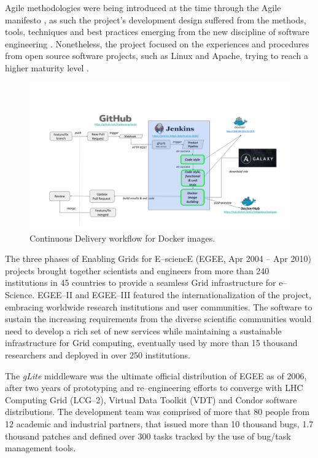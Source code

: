\documentclass[journal]{IEEEtran}
\begin{document}
Agile methodologies were being introduced at the time
through the Agile manifesto \cite{agile-manifesto}, as such the project's
development design suffered from the methods, tools, techniques and best
practices emerging from the new discipline of software engineering
\cite{agile}. Nonetheless, the project focused on the experiences and procedures
from open source software projects, such as Linux and Apache, trying to reach a
higher maturity level \cite{cmm}.

\begin{figure}
\centering
\includegraphics[width=\textwidth]{images/devops.png}
\caption{Continuous Delivery workflow for Docker images.}
\label{fig:fig_CD}
\end{figure}

The three phases of Enabling Grids for E--sciencE (EGEE, Apr 2004 -- Apr 2010)
\cite{cordis:egee, cordis:egee2, cordis:egee3} projects brought together
scientists and engineers from more than 240 institutions in 45 countries to
provide a seamless Grid infrastructure for e--Science. EGEE--II and EGEE--III
featured the internationalization of the project, embracing worldwide research
institutions and user communities. The software to sustain the increasing
requirements from the diverse scientific communities would need to develop a
rich set of new services while maintaining a sustainable infrastructure for
Grid computing, eventually used by more than 15 thousand researchers and deployed in
over 250 institutions.

The {\sl gLite} middleware \cite{glite} was the ultimate
official distribution of EGEE as of 2006, after two years of prototyping and
re--engineering efforts to converge with LHC Computing Grid (LCG--2), Virtual
Data Toolkit (VDT) and Condor \cite{condor} software distributions. The
development team was comprised of more that 80 people from 12 academic and
industrial partners, that issued more than 10 thousand bugs, 1.7 thousand patches and
defined over 300 tasks tracked by the use of bug/task management tools.
\end{document}
